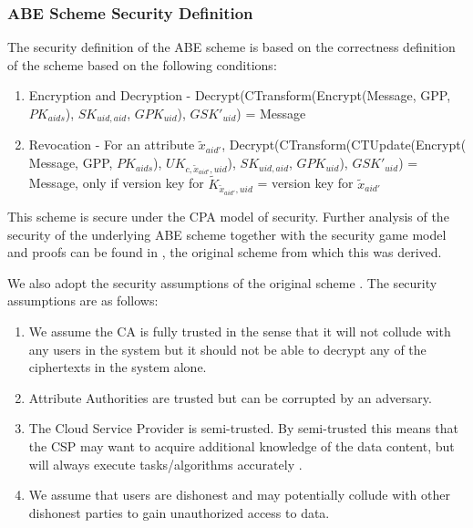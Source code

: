 \subsubsection*{ABE Scheme Security Definition}\label{secdef}

The security definition of the ABE scheme is based on the correctness definition of the scheme based on the following conditions:

\begin{enumerate}[label=(\arabic*)]
	\item Encryption and Decryption - Decrypt(CTransform(Encrypt(Message, GPP, $PK_{aids}$), $SK_{uid,aid}$, $GPK_{uid}$), $GSK'_{uid}$) = Message
	
	\item Revocation - For an attribute $\tilde{x}_{aid'}$, Decrypt(CTransform(CTUpdate(Encrypt(\\Message, GPP, $PK_{aids}$), ${UK}_{c,\tilde{x}_{aid'},uid}$), $SK_{uid,aid}$, $GPK_{uid}$), $GSK'_{uid}$) = Message, only if version key for $\tilde{K}_{\tilde{x}_{aid'},uid}$ = version key for $\tilde{x}_{aid'}$
\end{enumerate}

This scheme is secure under the CPA model of security. Further analysis of the security of the underlying ABE scheme together with the security game model and proofs can be found in \cite{Yang2014}, the original scheme from which this was derived.

We also adopt the security assumptions of the original  scheme \cite{Yang2014}. The security assumptions are as follows:

\begin{enumerate}[label=(\arabic*)]
	\item We assume the CA is fully trusted in the sense that it will not collude with any users in the system but it should not be able to decrypt any of the ciphertexts in the system alone.
	
	\item Attribute Authorities are trusted but can be corrupted by an adversary.
	
	\item The Cloud Service Provider is semi-trusted. By semi-trusted this means that the CSP may want to acquire additional knowledge of the data content, but will always execute tasks/algorithms accurately \cite{Yang2014}.
	
	\item We assume that users are dishonest and may potentially collude with other dishonest parties to gain unauthorized access to data.
\end{enumerate}

